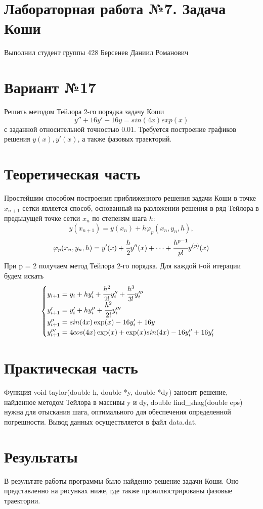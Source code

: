 \documentclass{report}
\begin{document}
\section*{Лабораторная работа №7. Задача Коши}
Выполнил студент группы 428 Берсенев Даниил Романович
\section*{Вариант №17}
Решить методом Тейлора 2-го порядка задачу Коши
$$y''+ 16y'-16y= sin(4x)exp(x)$$ с заданной относительной точностью 0.01. Требуется построение графиков решения $y(x), y'(x)$, а также фазовых траекторий.
\section*{Теоретическая часть}
Простейшим способом построения приближенного решения задачи Коши в точке $x_{n+1}$ сетки является способ, основанный на разложении решения в ряд Тейлора в предыдущей точке сетки $x_n$ по степеням шага $h$: $$y(x_{n+1}) = y(x_n) + h \varphi_p (x_n, y_n, h),$$ $$\varphi_p (x_n, y_n, h) = y'(x) + \cfrac{h}{2} y''(x) + \dots + \cfrac{h^{p-1}}{p!} y^{(p)}(x)$$При p = 2 получаем метод Тейлора 2-го порядка. Для каждой i-ой итерации будем искать $$\begin{cases} y_{i+1} = y_i + h y'_i + \cfrac{h^2}{2!}y''_i + \cfrac{h^3}{3!}y'''_i \\
y'_{i+1} = y'_i + hy''_i + \cfrac{h^2}{2!}y'''_i \\
y''_{i+1} = sin(4x)\exp(x) - 16y'_i +16y \\
y'''_{i+1} = 4cos(4x)\exp(x)+\exp(x)sin(4x) - 16y''_i + 16y'_i \\
\end{cases}$$
\section*{Практическая часть}
Функция void taylor(double h, double *y, double *dy) заносит решение, найденное методом Тейлора в массивы y и dy, double find\_shag(double eps) нужна для отыскания шага, оптимального для обеспечения определенной погрешности. Вывод данных осуществляется в файл data.dat.
\section*{Результаты}
В результате работы программы было найденно решение задачи Коши. Оно представленно на рисунках ниже, где также проиллюстрированы фазовые траектории.
\end{document}
